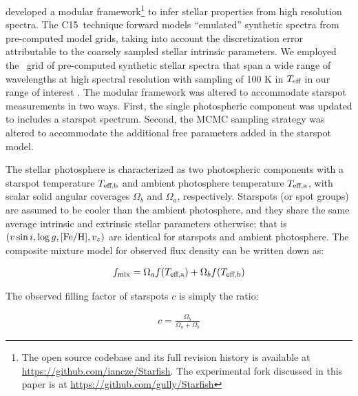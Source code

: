 \documentclass[twocolumn]{emulateapj}%
\newcommand{\iancze}{{\sc C15}}
\begin{document}
\citet[hereafter \iancze]{czekala15} developed a modular framework\footnote{The open source codebase and its full revision history is available at \url{https://github.com/iancze/Starfish}.  The experimental fork discussed in this paper is at \url{https://github.com/gully/Starfish}} to infer stellar properties from high resolution spectra.  The \iancze\ technique forward models ``emulated'' synthetic spectra from pre-computed model grids, taking into account the discretization error attributable to the coarsely sampled stellar intrinsic parameters.  We employed the \PHOENIX\ grid of pre-computed synthetic stellar spectra that span a wide range of wavelengths at high spectral resolution with sampling of 100 K in $T_\textrm{eff}$ in our range of interest \citep{husser13}.  The modular framework was altered to accommodate starspot measurements in two ways. First, the single photospheric component was updated to includes a starspot spectrum. Second, the MCMC sampling strategy was altered to accommodate the additional free parameters added in the starspot model.

The stellar photosphere is characterized as two photospheric components with a starspot temperature $T_\textrm{eff,b}$ and ambient photosphere temperature $T_\textrm{eff,a}$, with scalar solid angular coverages $\Omega_b$ and $\Omega_a$, respectively.    Starspots (or spot groups) are assumed to be cooler than the ambient photosphere, and they share the same average intrinsic and extrinsic stellar parameters otherwise; that is $(v \sin i, \log g, [{\rm Fe}/{\rm H}], v_z)$ are identical for starspots and ambient photosphere.  The composite mixture model for observed flux density can be written down as:

\begin{eqnarray} \label{eqn:mix_M}
f_{\mathrm{mix}} = \Omega_a f(T_\textrm{eff,a})  + \Omega_b f(T_\textrm{eff,b})
\end{eqnarray}

The observed filling factor of starspots $c$ is simply the ratio:

\begin{eqnarray} \label{eqn:fill_factor}
c = \frac{\Omega_b}{\Omega_a + \Omega_b}
\end{eqnarray}
\end{document}
